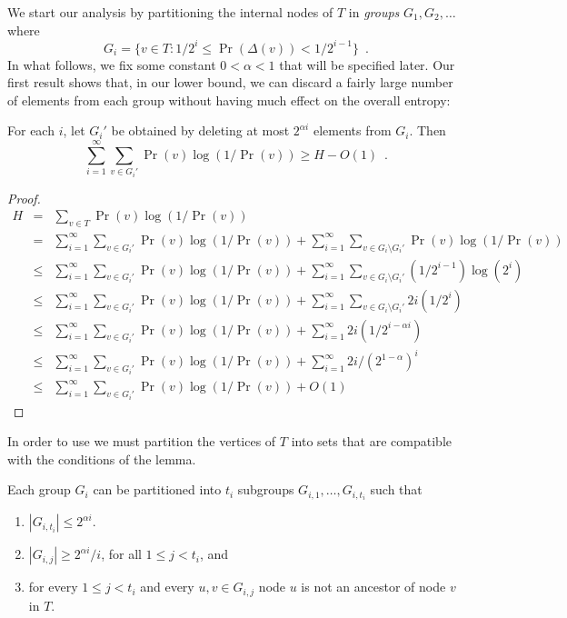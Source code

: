 \documentclass[charterfonts,lotsofwhite]{patmorin}
\begin{document}
We start our analysis by partitioning the internal nodes of $T$ in
\emph{groups} $G_1,G_2,\ldots$ where
\[
	G_i = \{v\in T : 1/2^{i} \le \Pr(\Delta(v)) < 1/2^{i-1} \} \enspace .
\]
In what follows, we fix some constant $0< \alpha < 1$ that will be
specified later.  Our first
result shows that, in our lower bound, we can discard a fairly large
number of elements from each group without having much effect on the
overall entropy:

\begin{lem}
For each $i$, let $G_i'$ be obtained by deleting at most $2^{\alpha
i}$ elements from $G_i$.  Then
\[
    \sum_{i=1}^\infty \sum_{v\in G_i'} \Pr(v)\log(1/\Pr(v)) \ge H-O(1)
	\enspace .
\]
\end{lem}

\begin{proof}
\begin{eqnarray*}
   H & = & \sum_{v\in T} \Pr(v)\log(1/\Pr(v)) \\
   & = & \sum_{i=1}^{\infty}\sum_{v\in G_i'} \Pr(v)\log (1/\Pr(v)) +
         \sum_{i=1}^{\infty}\sum_{v\in G_i\setminus G_i'} \Pr(v)\log (1/\Pr(v)) \\
   & \le & \sum_{i=1}^{\infty}\sum_{v\in G_i'} \Pr(v)\log (1/\Pr(v)) +
         \sum_{i=1}^{\infty}\sum_{v\in G_i\setminus G_i'} (1/2^{i-1})\log (2^i) \\
   & \le & \sum_{i=1}^{\infty}\sum_{v\in G_i'} \Pr(v)\log (1/\Pr(v)) +
         \sum_{i=1}^{\infty}\sum_{v\in G_i\setminus G_i'} 2i(1/2^{i}) \\
   & \le & \sum_{i=1}^{\infty}\sum_{v\in G_i'} \Pr(v)\log (1/\Pr(v)) +
         \sum_{i=1}^{\infty} 2i(1/2^{i-\alpha i}) \\
   & \le & \sum_{i=1}^{\infty}\sum_{v\in G_i'} \Pr(v)\log (1/\Pr(v)) +
         \sum_{i=1}^{\infty} 2i/(2^{1-\alpha})^{i} \\
   & \le & \sum_{i=1}^{\infty}\sum_{v\in G_i'} \Pr(v)\log (1/\Pr(v)) + O(1)
\end{eqnarray*}
\end{proof}

In order to use  we must partition the vertices of
$T$ into sets that are compatible with the conditions of the lemma.

\begin{lem}
Each group $G_i$ can be partitioned into $t_i$ subgroups
$G_{i,1},\ldots,G_{i,t_i}$ such that
\begin{enumerate}
\item $|G_{i,t_i}|\le 2^{\alpha i}$.

\item $|G_{i,j}| \ge 2^{\alpha i} / i$, for all $1\le j< t_i$, and

\item for every $1\le j< t_i$ and every $u,v\in G_{i,j}$ node $u$ is
not an ancestor of node $v$ in $T$. 

\end{enumerate}
\end{lem}
\end{document}
